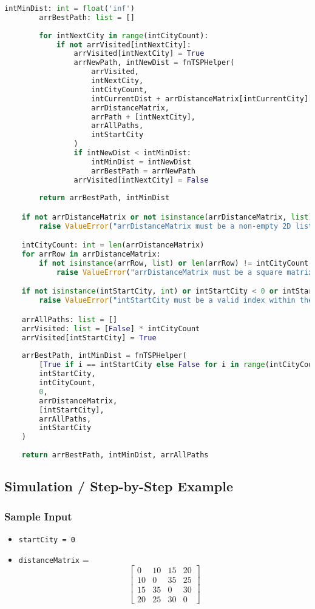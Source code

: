 \documentclass{article}
\begin{document}
\begin{lstlisting}[language=Python]
        intMinDist: int = float('inf')
        arrBestPath: list = []
        
        for intNextCity in range(intCityCount):
            if not arrVisited[intNextCity]:
                arrVisited[intNextCity] = True
                arrNewPath, intNewDist = fnTSPHelper(
                    arrVisited,
                    intNextCity,
                    intCityCount,
                    intCurrentDist + arrDistanceMatrix[intCurrentCity][intNextCity],
                    arrDistanceMatrix,
                    arrPath + [intNextCity],
                    arrAllPaths,
                    intStartCity
                )
                if intNewDist < intMinDist:
                    intMinDist = intNewDist
                    arrBestPath = arrNewPath
                arrVisited[intNextCity] = False
                
        return arrBestPath, intMinDist

    if not arrDistanceMatrix or not isinstance(arrDistanceMatrix, list):
        raise ValueError("arrDistanceMatrix must be a non-empty 2D list")

    intCityCount: int = len(arrDistanceMatrix)
    for arrRow in arrDistanceMatrix:
        if not isinstance(arrRow, list) or len(arrRow) != intCityCount:
            raise ValueError("arrDistanceMatrix must be a square matrix")

    if not isinstance(intStartCity, int) or intStartCity < 0 or intStartCity >= intCityCount:
        raise ValueError("intStartCity must be a valid index within the distance matrix")

    arrAllPaths: list = []
    arrVisited: list = [False] * intCityCount
    arrVisited[intStartCity] = True
    
    arrBestPath, intMinDist = fnTSPHelper(
        [True if i == intStartCity else False for i in range(intCityCount)],
        intStartCity,
        intCityCount,
        0,
        arrDistanceMatrix,
        [intStartCity],
        arrAllPaths,
        intStartCity
    )
    
    return arrBestPath, intMinDist, arrAllPaths
\end{lstlisting}

\subsection*{Simulation / Step-by-Step Example}
\subsubsection*{Sample Input}
\begin{itemize}
    \item \texttt{startCity = 0}
    \item \texttt{distanceMatrix} =
    \[
    \begin{bmatrix}
    0 & 10 & 15 & 20 \\
    10 & 0 & 35 & 25 \\
    15 & 35 & 0 & 30 \\
    20 & 25 & 30 & 0
    \end{bmatrix}
    \]
\end{itemize}
\end{document}
